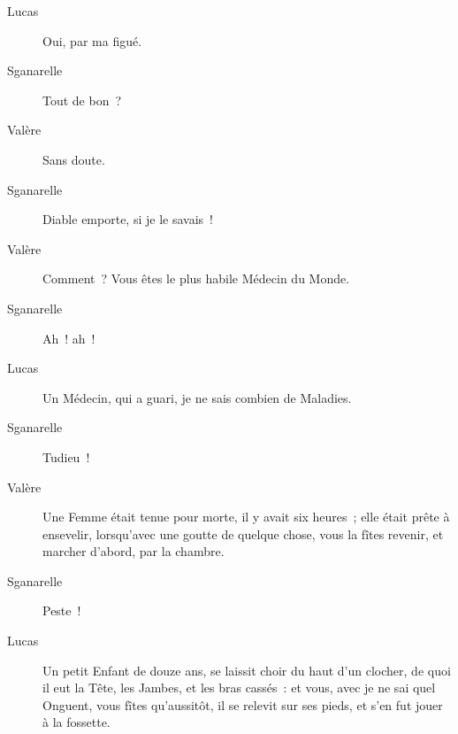 \documentclass[french,twoside]{book} %
\begin{document}
 \begin{description} \item[Lucas] 

Oui, par ma figué.\end{description}
 \begin{description} \item[Sganarelle] 

Tout de bon ?\end{description}
 \begin{description} \item[Valère] 

Sans doute.\end{description}
 \begin{description} \item[Sganarelle] 

Diable emporte, si je le savais !\end{description}
 \begin{description} \item[Valère] 

Comment ? Vous êtes le plus habile Médecin du Monde.\end{description}
 \begin{description} \item[Sganarelle] 

Ah ! ah !\end{description}
 \begin{description} \item[Lucas] 

Un Médecin, qui a guari, je ne sais combien de Maladies.\end{description}
 \begin{description} \item[Sganarelle] 

Tudieu !\end{description}
 \begin{description} \item[Valère] 

Une Femme était tenue pour morte, il y avait six heures ; elle était prête à ensevelir, lorsqu’avec une goutte de quelque chose, vous la fîtes revenir, et marcher d’abord, par la chambre.\end{description}
 \begin{description} \item[Sganarelle] 

Peste !\end{description}
 \begin{description} \item[Lucas] 

Un petit Enfant de douze ans, se laissit choir du haut d’un clocher, de quoi il eut la Tête, les Jambes, et les bras cassés : et vous, avec je ne sai quel Onguent, vous fîtes qu’aussitôt, il se relevit sur ses pieds, et s’en fut jouer à la fossette.\end{description}
\end{document}
